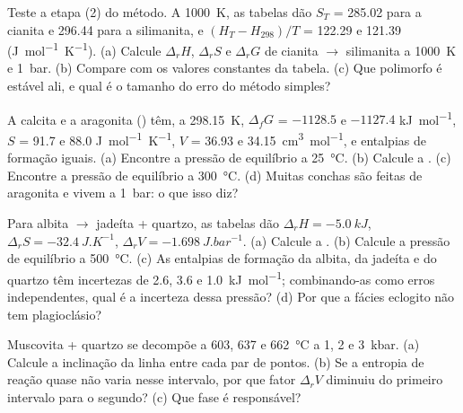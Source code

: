 \begin{exercise}[$\star\star$]\label{exo:b2:metamorphic-facies:6}
Teste a etapa (2) do método. A \qty{1000}{K}, as tabelas dão $S_T$ = 285.02 para a cianita
e 296.44 para a silimanita, e $(H_T - H_{298})/T$ = 122.29 e 121.39
(\unit{J.mol^{-1}.K^{-1}}). (a) Calcule $\Delta_r H$, $\Delta_r S$ e $\Delta_r G$ de
cianita $\to$ silimanita a \qty{1000}{K} e \qty{1}{bar}. (b) Compare com os valores
constantes da tabela. (c) Que polimorfo é estável ali, e qual é o tamanho do erro do
método simples?
\end{exercise}

\begin{exercise}[$\star\star$]\label{exo:b2:metamorphic-facies:7}
A calcita e a aragonita () têm, a \qty{298.15}{K}, $\Delta_f G$ = $-1128.5$ e
$-1127.4$ \unit{kJ.mol^{-1}}, $S$ = 91.7 e 88.0 \unit{J.mol^{-1}.K^{-1}}, $V$ = 36.93
e \qty{34.15}{cm^3.mol^{-1}}, e entalpias de formação iguais. (a) Encontre a
pressão de equilíbrio a \qty{25}{\celsius}. (b) Calcule a . (c) Encontre a
pressão de equilíbrio a \qty{300}{\celsius}. (d) Muitas conchas são feitas de aragonita e
vivem a \qty{1}{bar}: o que isso diz?
\end{exercise}

\begin{exercise}[$\star\star$]\label{exo:b2:metamorphic-facies:8}
Para albita $\to$ jadeíta + quartzo, as tabelas dão $\Delta_r H = \qty{-5.0}{kJ}$,
$\Delta_r S = \qty{-32.4}{J.K^{-1}}$, $\Delta_r V = \qty{-1.698}{J.bar^{-1}}$. (a)
Calcule a . (b) Calcule a pressão de equilíbrio a \qty{500}{\celsius}.
(c) As entalpias de formação da albita, da jadeíta e do quartzo têm incertezas de 2.6, 3.6
e \qty{1.0}{kJ.mol^{-1}}; combinando-as como erros independentes, qual é a incerteza dessa
pressão? (d) Por que a fácies eclogito não tem plagioclásio?
\end{exercise}

\begin{exercise}[$\star\star$]\label{exo:b2:metamorphic-facies:9}
Muscovita + quartzo se decompõe a 603, 637 e \qty{662}{\celsius} a 1, 2 e
\qty{3}{kbar}. (a) Calcule a inclinação da linha entre cada par de pontos. (b) Se a
entropia de reação quase não varia nesse intervalo, por que fator $\Delta_r V$
diminuiu do primeiro intervalo para o segundo? (c) Que fase é responsável?
\end{exercise}

